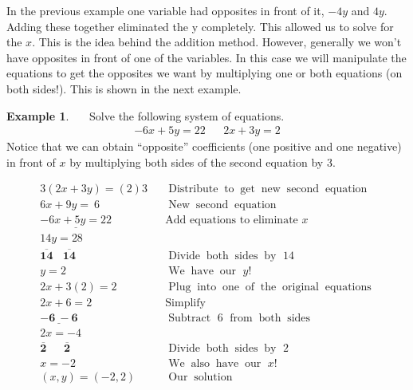 \documentclass[12pt]{book}
\theoremstyle{definition}
\newtheorem{example}{Example}
\newcommand{\tmmathbf}[1]{\ensuremath{\boldsymbol{#1}}}
\newcommand{\tmop}[1]{\ensuremath{\operatorname{#1}}}
\begin{document}
In the previous example one variable had opposites in front of it, $- 4 y$ and $4 y$. Adding these together eliminated the y completely. This allowed us to solve for the $x$. This is the idea behind the addition method. However, generally we won't have opposites in front of one of the variables. In this case we will manipulate the equations to get the opposites we want by multiplying one or both equations (on both sides!). This is shown in the next example.
\begin{example}~~~Solve the following system of equations.
\begin{eqnarray*}
      - 6 x + 5 y = 22 & & 2 x + 3 y = 2
\end{eqnarray*}
Notice that we can obtain ``opposite'' coefficients (one positive and one negative) in front of $x$ by multiplying both sides of the second equation by 3.
\end{example}
\begin{eqnarray*}
    3 (2 x + 3 y) = (2) 3 &  & \tmop{Distribute} \tmop{to} \tmop{get}
    \tmop{new} \tmop{second} \tmop{equation}\\
    6 x + 9 y = ~6~~~&  & \tmop{New} \tmop{second} \tmop{equation}\\
    \underline{- 6 x + 5 y = 22}~~ &  & \text{Add~equations~to eliminate~} x\\
    14 y = 28~~ &  &\\
    \tmmathbf{\overline{14} ~~~~ \overline{14}}~~ &  & \tmop{Divide} \tmop{both} \tmop{sides} \tmop{by~} 14 \\
    y = 2~~~~ &  & \tmop{We} \tmop{have} \tmop{our~} y!\\
    2 x + 3 (2) = 2~~~~ &  & \tmop{Plug} \tmop{into} \tmop{one} \tmop{of}
    \tmop{the} \tmop{original} \tmop{equations}\\
    2 x + 6 = 2~~~~ &  & \tmop{Simplify}\\
    \tmmathbf{\underline{- 6 ~- 6}}~~ &  & \tmop{Subtract~} 6 \tmop{~from} \tmop{both} \tmop{sides}\\
    2 x = - 4~~ &  & \\
    \tmmathbf{\overline{2} ~~~~~~~ \overline{2}}~~ &  & \tmop{Divide} \tmop{both} \tmop{sides} \tmop{by~} 2\\
    x = - 2~~ &  & \tmop{We} \tmop{also} \tmop{have} \tmop{our~} x!\\
    (x,y)=(- 2, 2) &  & \tmop{Our} \tmop{solution}
  \end{eqnarray*}
\end{document}
